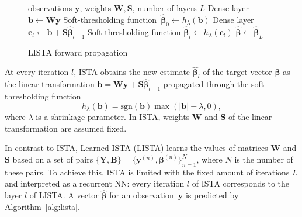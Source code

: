 \documentclass{article}
\begin{document}
 \begin{figure}  
 \vspace{-25pt}
\begin{minipage}{0.5\textwidth}
  \begin{algorithm}[H]
    \caption{LISTA forward propagation}
\label{alg:lista}   
    \begin{algorithmic}[1]
      \REQUIRE observations $\mathbf{y}$, weights $\mathbf{W}, \mathbf{S}$, number of layers $L$
      \STATE Dense layer $\mathbf{b} \gets \mathbf{W}\mathbf{y}$ \label{eq:first_layer}
      \STATE Soft-thresholding function~$\widehat{\boldsymbol\beta}_0 \gets h_\lambda(\mathbf{b})$ \label{eq:thr_first}
        \STATE Dense layer $\mathbf{c}_l \gets \mathbf{b} + \mathbf{S}\widehat{\boldsymbol\beta}_{l-1}$ \label{eq:l_dense_layer}
        \STATE Soft-thresholding function $\widehat{\boldsymbol\beta}_{l} \gets h_\lambda(\mathbf{c}_l)$ \label{eq:l_thr}
      \ENDFOR
      \RETURN $\widehat{\boldsymbol\beta} \gets \widehat{\boldsymbol\beta}_{L}$
    \end{algorithmic}
  \end{algorithm}
\end{minipage}
\end{figure}  
At every iteration $l$, ISTA obtains the new estimate $\widehat{\boldsymbol\beta}_l$ of the target vector $\boldsymbol\beta$ as the linear transformation $\mathbf{b} = \mathbf{W}\mathbf{y} + \mathbf{S}\widehat{\boldsymbol\beta}_{l-1}$ propagated through the soft-thresholding function %
  \begin{equation}
  h_\lambda(\mathbf{b}) = \text{sgn}(\mathbf{b}) \max(|\mathbf{b}| - \lambda, 0),
  \end{equation}
  where $\lambda$ is a shrinkage parameter.
  In ISTA, weights $\mathbf{W}$ and $\mathbf{S}$ of the linear transformation are assumed fixed.
   
In contrast to ISTA, Learned ISTA (LISTA) \cite{gregor2010learning} learns the values of matrices $\mathbf{W}$ and $\mathbf{S}$ based on a set of pairs $\{\mathbf{Y}, \mathbf{B}\}=\{\mathbf{y}^{(n)}, \boldsymbol\beta^{(n)}\}_{n=1}^N$, where $N$ is the number of these pairs. To achieve this, ISTA is limited with the fixed amount of iterations $L$ and interpreted as a recurrent NN: every iteration $l$ of ISTA corresponds to the layer $l$ of LISTA. A vector $\widehat{\boldsymbol\beta}$ for an observation~$\mathbf{y}$ is predicted by Algorithm~\ref{alg:lista}.
\end{document}

